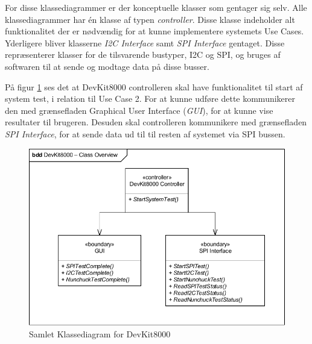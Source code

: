For disse klassediagrammer er der konceptuelle klasser som gentager sig selv. Alle klassediagrammer har én klasse af typen \textit{controller}. Disse klasse indeholder alt funktionalitet der er nødvændig for at kunne implementere systemets Use Cases. Yderligere bliver klasserne \textit{I2C Interface} samt \textit{SPI Interface} gentaget. Disse repræsenterer klasser for de tilsvarende bustyper, I2C og SPI, og bruges af softwaren til at sende og modtage data på disse busser.

På figur \ref{fig:CompleteClassDiagramDevKit8000} ses det at DevKit8000 controlleren skal have funktionalitet til start af system test, i relation til Use Case 2. For at kunne udføre dette kommunikerer den med grænsefladen Graphical User Interface (\textit{GUI}), for at kunne vise resultater til brugeren. Desuden skal controlleren kommunikere med grænsefladen \textit{SPI Interface}, for at sende data ud til til resten af systemet via SPI bussen.
\begin{figure}[H]
	\centering
	\includegraphics[width=\textwidth] {Systemarkitektur/images/CompleteClassDiagramDevKit8000}
	\caption{Samlet Klassediagram for DevKit8000}
	\label{fig:CompleteClassDiagramDevKit8000}
\end{figure}

